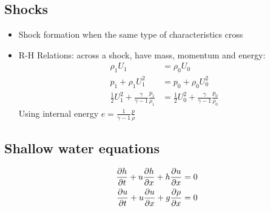 \subsection*{Shocks}
    \begin{itemize}
        \item Shock formation when the same type of characteristics cross
        \item R-H Relations: across a shock, have mass, momentum and energy:
        \begin{align*}
            \rho_1U_1 &=\rho_0 U_0 \\ 
            p_1 + \rho_1U_1^2 &=p_0 + \rho_0U_0^2 \\
            \frac{1}{2}U_1^2 + \frac{\gamma}{\gamma-1}\frac{p_1}{\rho_1} &= \frac{1}{2}U_0^2 + \frac{\gamma}{\gamma-1}\frac{p_0}{\rho_0}
        \end{align*}
        Using internal energy $e = \frac{1}{\gamma-1}\frac{p}{\rho}$
    \end{itemize}
    \subsection*{Shallow water equations}
    \begin{align*}
        \frac{\partial{h}}{\partial{t}} + u \frac{\partial{h}}{\partial{x}} + h \frac{\partial{u}}{\partial{x}} &= 0  \\
        \frac{\partial{u}}{\partial{t}} + u \frac{\partial{u}}{\partial{x}} +g \frac{\partial{\rho}}{\partial{x}}   &= 0 
    \end{align*}
